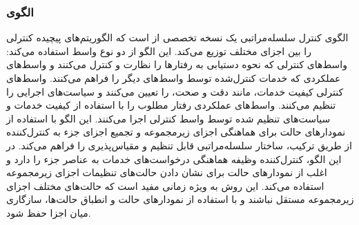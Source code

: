 \subsubsection{الگوی }
\label{archHierContSec}
\begin{RTL}
الگوی کنترل سلسله‌مراتبی \cite{ref4} یک
نسخه تخصصی از 
است که الگوریتم‌های پیچیده کنترلی را بین اجزای مختلف توزیع می‌کند.
این الگو از دو نوع واسط استفاده می‌کند:
واسط‌های کنترلی که نحوه دستیابی به رفتارها را نظارت و کنترل می‌کنند
و واسط‌های عملکردی که خدمات کنترل‌شده توسط واسط‌های دیگر را فراهم می‌کنند.
واسط‌های کنترلی کیفیت خدمات، مانند دقت و صحت، را تعیین می‌کنند
و سیاست‌های اجرایی را تنظیم می‌کنند. واسط‌های عملکردی رفتار مطلوب
را با استفاده از کیفیت خدمات و سیاست‌های تنظیم شده توسط واسط
کنترلی اجرا می‌کنند. این الگو با استفاده از نمودارهای حالت برای
هماهنگی اجزای زیرمجموعه و تجمیع اجزای جزء به کنترل‌کننده
از طریق ترکیب، ساختار سلسله‌مراتبی قابل تنظیم و مقیاس‌پذیری را
فراهم می‌کند. در این الگو، کنترل‌کننده وظیفه هماهنگی درخواست‌های
خدمات به عناصر جزء را دارد و اغلب از نمودارهای حالت برای نشان
دادن حالت‌های تنظیمات اجزای زیرمجموعه استفاده می‌کند. این روش
به ویژه زمانی مفید است که حالت‌های مختلف اجزای زیرمجموعه مستقل
نباشند و با استفاده از نمودارهای حالت و انطباق حالت‌ها، سازگاری میان اجزا حفظ شود.
\end{RTL}